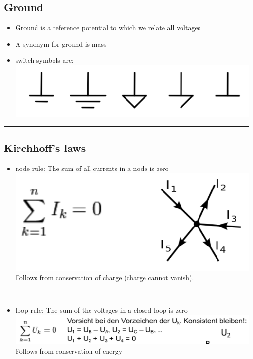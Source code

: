 \documentclass[a4paper]{article}
\providecommand{\tightlist}{%
  \setlength{\itemsep}{0pt}\setlength{\parskip}{0pt}}
\begin{document}
\begin{multicols*}{3}
\hypertarget{ground}{%
\subsection{Ground}\label{ground}}

\begin{itemize}
\tightlist
\item
  Ground is a reference potential to which we relate all voltages
\item
  A synonym for ground is mass
\item
  switch symbols are:
  \includegraphics{../assets/images/2022-02-06-20-55-45.png}
\end{itemize}

\begin{center}\rule{0.5\linewidth}{0.5pt}\end{center}

\hypertarget{kirchhoffs-laws}{%
\subsection{Kirchhoff's laws}\label{kirchhoffs-laws}}

\begin{itemize}
\tightlist
\item
  node rule: The sum of all currents in a node is zero
  \includegraphics{../assets/images/2022-02-06-21-02-31.png} Follows from
  conservation of charge (charge cannot vanish).
\end{itemize}

--

\begin{itemize}
\tightlist
\item
  loop rule: The sum of the voltages in a closed loop is zero
  \includegraphics{../assets/images/2022-02-06-21-04-47.png} Follows from
  conservation of energy
\end{itemize}


\end{multicols*}
\end{document}
